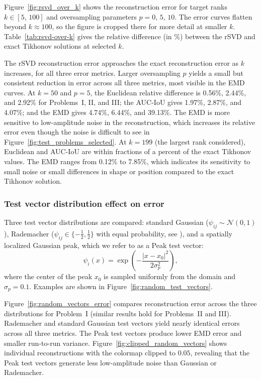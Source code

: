 Figure~\ref{fig:rsvd_over_k} shows the reconstruction error for target ranks $k \in [5,\, 100]$ and oversampling parameters $p = 0,\, 5,\, 10$. The error curves flatten beyond $k \approx 100$, so the figure is cropped there for more detail at smaller $k$. Table~\ref{tab:rsvd-over-k} gives the relative difference (in \%) between the rSVD and exact Tikhonov solutions at selected $k$.

The rSVD reconstruction error approaches the exact reconstruction error as $k$ increases, for all three error metrics. Larger oversampling $p$ yields a small but consistent reduction in error across all three metrics, most visible in the EMD curves. At $k = 50$ and $p = 5$, the Euclidean relative difference is 0.56\%, 2.44\%, and 2.92\% for Problems~I, II, and III; the AUC-IoU gives 1.97\%, 2.87\%, and 4.07\%; and the EMD gives 4.74\%, 6.44\%, and 39.13\%. The EMD is more sensitive to low-amplitude noise in the reconstruction, which increases its relative error even though the noise is difficult to see in Figure~\ref{fig:test_problems_selected}. At $k = 199$ (the largest rank considered), Euclidean and AUC-IoU are within fractions of a percent of the exact Tikhonov values. The EMD ranges from 0.12\% to 7.85\%, which indicates its sensitivity to small noise or small differences in shape or position compared to the exact Tikhonov solution.


\subsubsection{Test vector distribution effect on error}\label{sec:test_vector_distribution_effect_on_error}

Three test vector distributions are compared: standard Gaussian ($\psi_{ij} \sim \mathcal{N}(0,1)$), Rademacher ($\psi_{ij} \in \{-\tfrac{1}{2}, \tfrac{1}{2}\}$ with equal probability, see \cite{montgomery-smithDistributionRademacherSums1990}), and a spatially localized Gaussian peak, which we refer to as a Peak test vector:
\begin{equation*}
    \psi_i(x) = \exp\left(-\frac{|x - x_0|^2}{2\sigma_p^2}\right),
\end{equation*}
where the center of the peak $x_0$ is sampled uniformly from the domain and $\sigma_p = 0.1$. Examples are shown in Figure~\ref{fig:random_test_vectors}.



Figure~\ref{fig:random_vectors_error} compares reconstruction error across the three distributions for Problem~I (similar results hold for Problems~II and III). Rademacher and standard Gaussian test vectors yield nearly identical errors across all three metrics. The Peak test vectors produce lower EMD error and smaller run-to-run variance. Figure~\ref{fig:clipped_random_vectors} shows individual reconstructions with the colormap clipped to $0.05$, revealing that the Peak test vectors generate less low-amplitude noise than Gaussian or Rademacher.


